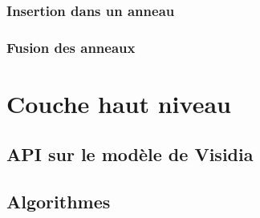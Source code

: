 \documentclass[a4paper,10pt]{report}
\begin{document}
      \subsubsection{Insertion dans un anneau}
      \subsubsection{Fusion des anneaux}
  \section{Couche haut niveau}
    \subsection{API sur le modèle de Visidia}
    \subsection{Algorithmes} 
    
    
    
\end{document}
